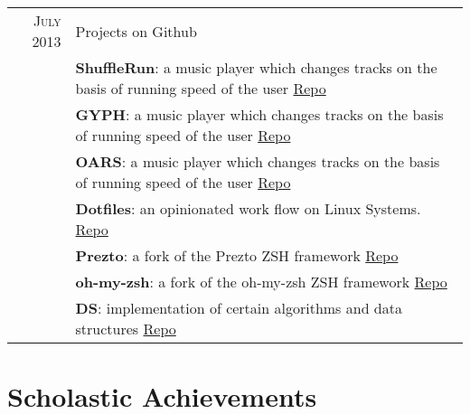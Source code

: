 \documentclass[a4paper,10pt]{article} %
\begin{document}
\begin{tabular}{r|p{11cm}}
    \textsc{July 2013} & Projects on Github \\
        & \footnotesize{\textbf{ShuffleRun}: a music player which changes tracks on the basis of running speed of the user
            \href{https://github.com/srijanshetty/ShuffleRun} {Repo} }\\
        & \footnotesize{\textbf{GYPH}: a music player which changes tracks on the basis of running speed of the user
            \href{https://github.com/srijanshetty/ShuffleRun} {Repo} }\\
        & \footnotesize{\textbf{OARS}: a music player which changes tracks on the basis of running speed of the user
            \href{https://github.com/srijanshetty/ShuffleRun} {Repo} }\\
        & \footnotesize{\textbf{Dotfiles}: an opinionated work flow on Linux Systems. \href{https://github.com/srijanshetty/dotfiles} {Repo} } \\
        & \footnotesize{\textbf{Prezto}: a fork of the Prezto ZSH framework  \href{https://github.com/srijanshetty/prezto} {Repo}} \\
        & \footnotesize {\textbf{oh-my-zsh}: a fork of the oh-my-zsh ZSH framework \href{https://github.com/srijanshetty/oh-my-zsh} {Repo} } \\
        & \footnotesize{\textbf{DS}: implementation of certain algorithms and data structures \href{https://github.com/srijanshetty/DS} {Repo}} \\

\end{tabular}

\section{Scholastic Achievements}
\end{document}
